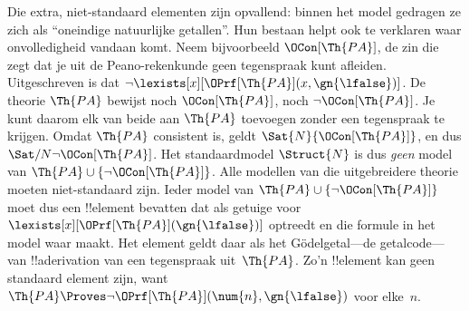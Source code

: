 \documentclass[../../../include/open-logic-section]{subfiles}
\begin{document}
Die extra, niet-standaard elementen zijn opvallend: binnen het model gedragen
ze zich als ``oneindige natuurlijke getallen''. Hun bestaan helpt ook te
verklaren waar onvolledigheid vandaan komt. Neem bijvoorbeeld
$\OCon[\Th{PA}]$, de zin die zegt dat je uit de Peano-rekenkunde geen
tegenspraak kunt afleiden. Uitgeschreven is dat $\lnot
\lexists[x][\OPrf[\Th{PA}](x, \gn{\lfalse})]$. De theorie $\Th{PA}$ bewijst
noch $\OCon[\Th{PA}]$, noch $\lnot \OCon[\Th{PA}]$. Je kunt daarom elk van
beide aan $\Th{PA}$ toevoegen zonder een tegenspraak te krijgen. Omdat
$\Th{PA}$ consistent is, geldt $\Sat{N}{\OCon[\Th{PA}]}$, en dus
$\Sat/{N}{\lnot \OCon[\Th{PA}]}$. Het standaardmodel $\Struct{N}$ is dus
\emph{geen} model van $\Th{PA} \cup \{\lnot \OCon[\Th{PA}]\}$. Alle
modellen van die uitgebreidere theorie moeten niet-standaard zijn. Ieder
model van $\Th{PA} \cup \{\lnot \OCon[\Th{PA}]\}$ moet dus een
!!{element} bevatten dat als getuige voor
$\lexists[x][\OPrf[\Th{PA}](\gn{\lfalse})]$ optreedt en die formule in het
model waar maakt. Het element geldt daar als het G\"odelgetal---de
getalcode---van !!a{derivation} van een tegenspraak uit~$\Th{PA}$. Zo'n
!!{element} kan geen standaard element zijn, want $\Th{PA} \Proves \lnot
\OPrf[\Th{PA}](\num{n}, \gn{\lfalse})$ voor elke~$n$.
\end{document}

